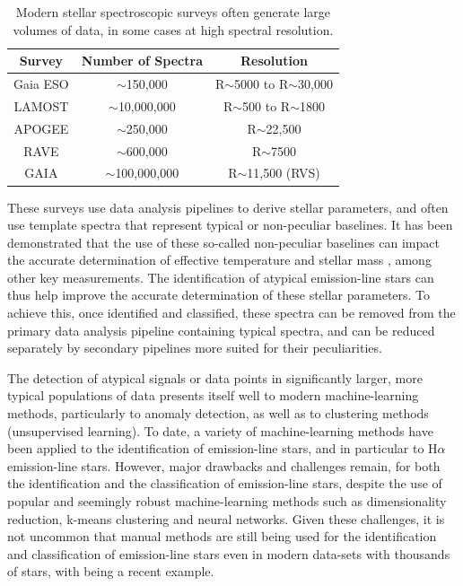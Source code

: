 \begin{table}[!htb]
\begin{center}
\begin{tabular}{|c|c|c|}
\hline
\textbf{Survey} & \textbf{Number of Spectra} & \textbf{Resolution} \\ \hline
Gaia ESO        & $\sim$150,000              & R$\sim$5000 to R$\sim$30,000             \\ \hline
LAMOST          & $\sim$10,000,000           & R$\sim$500 to R$\sim$1800              \\ \hline
APOGEE          & $\sim$250,000              & R$\sim$22,500             \\ \hline
RAVE            & $\sim$600,000              & R$\sim$7500                 \\ \hline
GAIA            & $\sim$100,000,000          & R$\sim$11,500 (RVS)               \\ \hline
\end{tabular}
\caption{Modern stellar spectroscopic surveys often generate large volumes of data, in some cases at high spectral resolution.}
\label{table:draglift1}
\end{center}
\end{table}
These surveys use data analysis pipelines to derive stellar parameters, and often use template spectra that represent typical or non-peculiar baselines. It has been demonstrated that the use of these so-called non-peculiar baselines can impact the accurate determination of effective temperature \citep{cayrel2011halpha, amarsi2018effective, giribaldi2019accurate} and stellar mass \citep{ness2016spectroscopic, bergemann2016gaia}, among other key measurements. The identification of atypical emission-line stars can thus help improve the accurate determination of these stellar parameters. To achieve this, once identified and classified, these spectra can be removed from the primary data analysis pipeline containing typical spectra, and can be reduced separately by secondary pipelines more suited for their peculiarities. 

The detection of atypical signals or data points in significantly larger, more typical populations of data presents itself well to modern machine-learning methods, particularly to anomaly detection, as well as to clustering methods (unsupervised learning). To date, a variety of machine-learning methods have been applied to the identification of emission-line stars, and in particular to H$\alpha$ emission-line stars. However, major drawbacks and challenges remain, for both the identification and the classification of emission-line stars, despite the use of popular and seemingly robust machine-learning methods such as dimensionality reduction, k-means clustering and neural networks. Given these challenges, it is not uncommon that manual methods are still being used for the identification and classification of emission-line stars even in modern data-sets with thousands of stars, with \citet{zhang2021catalog} being a recent example.  

